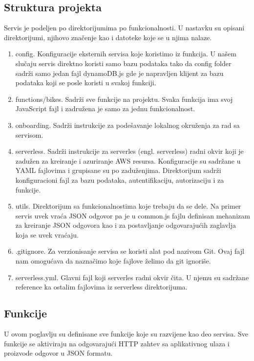 \documentclass[12pt,oneside]{memoir}
\begin{document}
\subsection{Struktura projekta}
Servis je podeljen po direktorijumima po funkcionalnosti. U nastavku su opisani direktorijumi, njihovo značenje kao i datoteke koje se u njima nalaze.

\begin{enumerate}
  \item config. Konfiguracije eksternih servisa koje koristimo iz funkcija. U našem slučaju servis direktno koristi samo bazu podataka tako da config folder sadrži samo jedan fajl dynamoDB.js gde je napravljen klijent za bazu podataka koji se posle koristi u svakoj funkciji.
  \item functions/bikes. Sadrži sve funkcije na projektu. Svaka funkcija ima svoj JavaScript fajl i zadružena je samo za jednu funkcionalnost. 
  \item onboarding. Sadrži instrukcije za podešavanje lokalnog okruženja za rad sa servisom.
  \item serverless. Sadrži instrukcije za serverles (engl. serverless) radni okvir koji je zadužen za kreiranje i azuriranje AWS resursa. Konfiguracije su sadržane u YAML fajlovima i grupisane su po zaduženjima. Direktorijum sadrži konfiguracioni fajl za bazu podataka, autentifikaciju, autorizaciju i za funkcije.
  \item utils. Direktorijum sa funkcionalnostima koje trebaju da se dele. Na primer servis uvek vraća JSON odgovor pa je u common.js fajlu definisan mehanizam za kreiranje JSON odgovora kao i za postavljanje odgovarajućih zaglavlja koja se uvek vraćaju.
  \item .gitignore. Za verzionisanje servisa se koristi alat pod nazivom Git. Ovaj fajl nam omogućava da naznačimo koje fajlove želimo da git ignoriše.
  \item serverless.yml. Glavni fajl koji serverles radni okvir čita. U njemu su sadržane reference ka ostalim fajlovima iz serverless direktorijuma.
\end{enumerate}

\subsection{Funkcije}
U ovom poglavlju su definisane sve funkcije koje su razvijene kao deo servisa. Sve funkcije se aktiviraju na odgovarajući HTTP zahtev sa aplikativnog ulaza i proizvode odgovor u JSON formatu.
\end{document}
